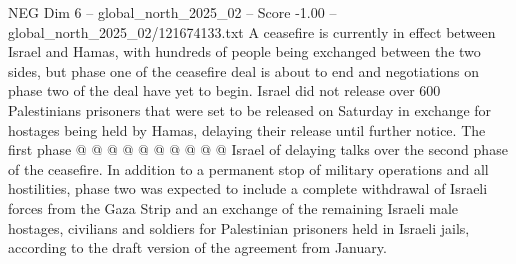 \begin{textsample}{NEG Dim 6 – global\_north\_2025\_02 – Score -1.00 – global\_north\_2025\_02/121674133.txt}
A ceasefire is currently in effect between Israel and Hamas, with hundreds of people being exchanged between the two sides, but phase one of the ceasefire deal is about to end and negotiations on phase two of the deal have yet to begin.
Israel did not release over 600 Palestinians prisoners that were set to be released on Saturday in exchange for hostages being held by Hamas, delaying their release until further notice.
The first phase @ @ @ @ @ @ @ @ @ @ Israel of delaying talks over the second phase of the ceasefire.
In addition to a permanent stop of military operations and all hostilities, phase two was expected to include a complete withdrawal of Israeli forces from the Gaza Strip and an exchange of the remaining Israeli male hostages, civilians and soldiers for Palestinian prisoners held in Israeli jails, according to the draft version of the agreement from January.

\end{textsample}
